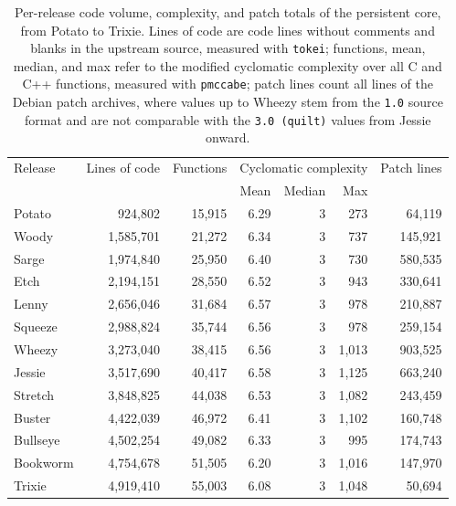 \begin{table}[ht!]
  \centering
  \setcapindent{0pt}
  \renewcommand{\arraystretch}{0.95}
  \caption[Per-release code volume, complexity, and patch totals of the persistent core.]{Per-release code volume, complexity, and patch totals of the persistent core, from Potato to Trixie. Lines of code are code lines without comments and blanks in the upstream source, measured with \texttt{tokei}; functions, mean, median, and max refer to the modified cyclomatic complexity over all C and C++ functions, measured with \texttt{pmccabe}; patch lines count all lines of the Debian patch archives, where values up to Wheezy stem from the \texttt{1.0} source format and are not comparable with the \texttt{3.0 (quilt)} values from Jessie onward.}
  \label{tab:metrics-code}
  \footnotesize
  \setlength{\tabcolsep}{5pt}
  \begin{tabular}{lrrrrrr}
    \hline
    Release & Lines of code & Functions & \multicolumn{3}{c}{Cyclomatic complexity} & Patch lines \\
            &               &           & Mean & Median & Max &  \\
    \hline
    Potato   & 924{,}802   & 15{,}915 & 6.29 & 3 & 273    & 64{,}119  \\
    Woody    & 1{,}585{,}701 & 21{,}272 & 6.34 & 3 & 737    & 145{,}921 \\
    Sarge    & 1{,}974{,}840 & 25{,}950 & 6.40 & 3 & 730    & 580{,}535 \\
    Etch     & 2{,}194{,}151 & 28{,}550 & 6.52 & 3 & 943    & 330{,}641 \\
    Lenny    & 2{,}656{,}046 & 31{,}684 & 6.57 & 3 & 978    & 210{,}887 \\
    Squeeze  & 2{,}988{,}824 & 35{,}744 & 6.56 & 3 & 978    & 259{,}154 \\
    Wheezy   & 3{,}273{,}040 & 38{,}415 & 6.56 & 3 & 1{,}013 & 903{,}525 \\
    Jessie   & 3{,}517{,}690 & 40{,}417 & 6.58 & 3 & 1{,}125 & 663{,}240 \\
    Stretch  & 3{,}848{,}825 & 44{,}038 & 6.53 & 3 & 1{,}082 & 243{,}459 \\
    Buster   & 4{,}422{,}039 & 46{,}972 & 6.41 & 3 & 1{,}102 & 160{,}748 \\
    Bullseye & 4{,}502{,}254 & 49{,}082 & 6.33 & 3 & 995    & 174{,}743 \\
    Bookworm & 4{,}754{,}678 & 51{,}505 & 6.20 & 3 & 1{,}016 & 147{,}970 \\
    Trixie   & 4{,}919{,}410 & 55{,}003 & 6.08 & 3 & 1{,}048 & 50{,}694  \\
    \hline
  \end{tabular}
\end{table}

